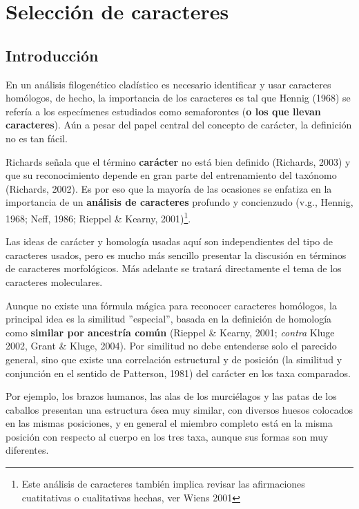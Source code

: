 \chapter{Selecci\'on de caracteres}
\section*{Introducci\'on}

En un an\'alisis filogen\'etico clad\'istico es necesario identificar y usar caracteres hom\'ologos, de hecho, la importancia de los caracteres es tal que Hennig (1968) se refer\'ia a los espec\'imenes estudiados como semaforontes (\textbf{o los que llevan caracteres}). A\'un a pesar del papel central del concepto de car\'acter, la definici\'on no es tan f\'acil.


Richards se\~nala que el t\'ermino 
\textbf{car\'acter} no est\'a bien definido (Richards, 2003) y que su 
reconocimiento depende en gran parte del entrenamiento del tax\'onomo 
(Richards, 2002). 
Es por eso que la mayor\'ia de las ocasiones se 
enfatiza en la importancia de un \textbf{an\'alisis de caracteres} 
profundo y concienzudo (v.g., Hennig, 1968; Neff, 1986; Rieppel \& 
Kearny, 2001)\footnote{Este an\'alisis de caracteres tambi\'en implica revisar las afirmaciones cuatitativas o cualitativas hechas, ver 
Wiens 2001 
}.

Las ideas de car\'acter y homolog\'ia usadas aqu\'i 
son independientes del tipo de caracteres usados, pero es mucho m\'as 
sencillo presentar la discusi\'on en t\'erminos de caracteres 
morfol\'ogicos. M\'as adelante se tratar\'a directamente el tema de los 
caracteres moleculares. 

Aunque no existe una f\'ormula m\'agica para reconocer caracteres hom\'ologos, 
la principal idea es la similitud ''especial'', basada en 
la definici\'on de homolog\'ia como \textbf {similar por ancestr\'ia 
com\'un} (Rieppel \& Kearny, 2001; \textit {contra} Kluge 2002, 
Grant \& Kluge, 2004). Por similitud no debe entenderse solo el 
parecido general, sino que existe una correlaci\'on estructural y de 
posici\'on (la similitud y conjunci\'on en el sentido de Patterson, 
1981) del car\'acter en los taxa comparados. 

Por ejemplo, los brazos humanos, las alas de los murci\'elagos y las 
patas de los caballos presentan una estructura \'osea muy similar, 
con diversos huesos colocados en las mismas posiciones, y en general 
el miembro completo est\'a en la misma posici\'on con respecto al 
cuerpo en los tres taxa, aunque sus formas son muy diferentes. 


